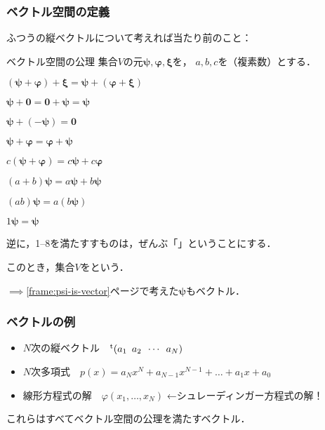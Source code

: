 \documentclass[
    10pt,
    ]{sotsu-beamer}
\begin{document}
\begin{frame}
    [label={frame:definition-of-vector-space}]
    \frametitle{ベクトル空間の定義}
    
    ふつうの縦ベクトルについて考えれば当たり前のこと：
    \begin{block}{ベクトル空間の公理}
        集合$V$の元$\symbf{\psi}, \symbf{\varphi}, \symbf{\xi}$を，
        $a, b, c$を（複素数）とする．
        \begin{enumerate}
            \begin{multicols}{2}
                \item $(\symbf{\psi} + \symbf{\varphi}) + \symbf{\xi} = \symbf{\psi} + (\symbf{\varphi} + \symbf{\xi})$
                \item $\symbf{\psi} + \symbf{0} = \symbf{0} + \symbf{\psi} = \symbf{\psi}$
                \item $\symbf{\psi} + (-\symbf{\psi}) = \symbf{0}$
                \item $\symbf{\psi} + \symbf{\varphi} = \symbf{\varphi} + \symbf{\psi}$
                \item $c (\symbf{\psi} + \symbf{\varphi}) = c \symbf{\psi} + c \symbf{\varphi}$
                \item $(a + b) \symbf{\psi} = a \symbf{\psi} + b \symbf{\psi}$
                \item $(ab) \symbf{\psi} = a(b\symbf{\psi})$
                \item $1 \symbf{\psi} = \symbf{\psi}$
            \end{multicols}
        \end{enumerate}
    \end{block}

    \pause

    \alert{逆に，1--8を満たすすものは，ぜんぶ「」ということにする}．
    
    このとき，集合$V$をという．
    
    $\implies$\ref{frame:psi-is-vector}ページで考えた$\symbf{\psi}$もベクトル．

\end{frame}


\begin{frame}
    \frametitle{ベクトルの例}

    \begin{itemize}
        \item $N$次の縦ベクトル　$\cvector{a_1 ; a_2 ; \cdots ; a_N}$
        \item $N$次多項式　$p(x) = a_N x^N + a_{N-1} x^{N-1} + \dots + a_1 x + a_0$
        \item 線形方程式の解　$\varphi(x_1, \dots, x_N)$
            ←\alert{シュレーディンガー方程式の解！}
    \end{itemize}
    これらはすべてベクトル空間の公理を満たすベクトル．
\end{frame}
\end{document}
